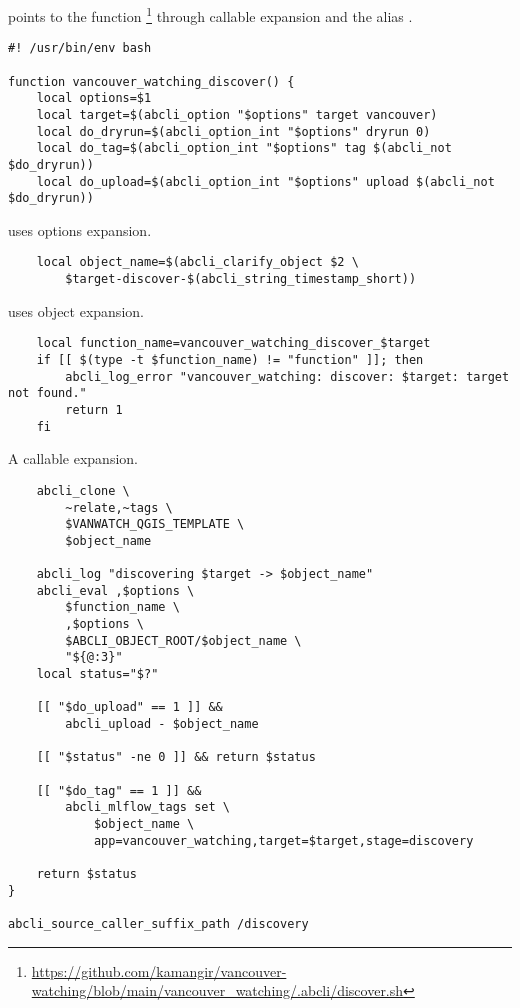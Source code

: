  points to the function \footnote{\url{https://github.com/kamangir/vancouver-watching/blob/main/vancouver_watching/.abcli/discover.sh}} through callable expansion and the alias .
%
\begin{graybox}
\begin{verbatim}
#! /usr/bin/env bash

function vancouver_watching_discover() {
    local options=$1
    local target=$(abcli_option "$options" target vancouver)
    local do_dryrun=$(abcli_option_int "$options" dryrun 0)
    local do_tag=$(abcli_option_int "$options" tag $(abcli_not $do_dryrun))
    local do_upload=$(abcli_option_int "$options" upload $(abcli_not $do_dryrun))
\end{verbatim}
\end{graybox}
%
 uses options expansion.
%
\begin{graybox}
\begin{verbatim}
    local object_name=$(abcli_clarify_object $2 \
        $target-discover-$(abcli_string_timestamp_short))
\end{verbatim}
\end{graybox}
%
 uses object expansion.
%
\begin{graybox}
\begin{verbatim}
    local function_name=vancouver_watching_discover_$target
    if [[ $(type -t $function_name) != "function" ]]; then
        abcli_log_error "vancouver_watching: discover: $target: target not found."
        return 1
    fi
\end{verbatim}
\end{graybox}
%
A callable expansion.
%
\begin{graybox}
\begin{verbatim}
    abcli_clone \
        ~relate,~tags \
        $VANWATCH_QGIS_TEMPLATE \
        $object_name

    abcli_log "discovering $target -> $object_name"
    abcli_eval ,$options \
        $function_name \
        ,$options \
        $ABCLI_OBJECT_ROOT/$object_name \
        "${@:3}"
    local status="$?"

    [[ "$do_upload" == 1 ]] &&
        abcli_upload - $object_name

    [[ "$status" -ne 0 ]] && return $status

    [[ "$do_tag" == 1 ]] &&
        abcli_mlflow_tags set \
            $object_name \
            app=vancouver_watching,target=$target,stage=discovery

    return $status
}

abcli_source_caller_suffix_path /discovery
\end{verbatim}
\end{graybox}
